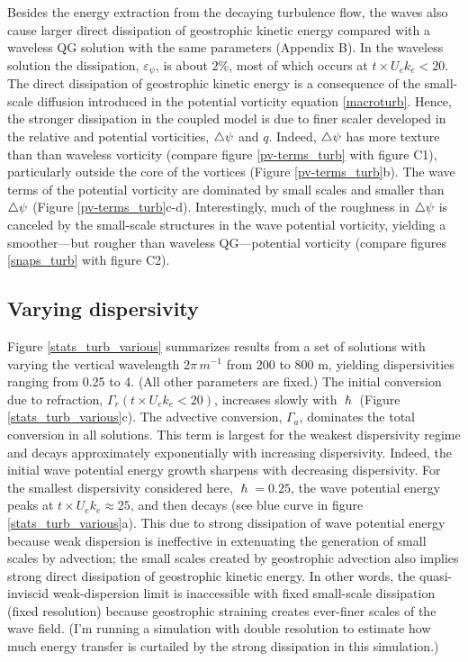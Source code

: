 \documentclass{jfm}
\begin{document}
Besides the energy extraction from the decaying turbulence flow, the waves
also cause larger direct dissipation of geostrophic kinetic energy compared with
a waveless QG solution with the same parameters (Appendix B). In the waveless solution
the dissipation, $\varepsilon_\psi$, is about $2\%$, most of which occurs at
$t\times U_e k_e < 20$. The direct dissipation of geostrophic kinetic energy is
a consequence of the small-scale diffusion introduced in the potential vorticity equation
\eqref{macroturb}. Hence, the stronger
dissipation in the coupled model is due to finer scaler developed in the relative
and potential
vorticities, $\triangle\psi$ and $q$. Indeed,
$\triangle\psi$ has more texture than than waveless vorticity
(compare figure \ref{pv-terms_turb} with figure C1),
particularly outside the core of the vortices (Figure \eqref{pv-terms_turb}b).
The wave terms of the potential vorticity  are dominated by small scales and
smaller than $\triangle\psi$ (Figure \eqref{pv-terms_turb}c-d). Interestingly, much
of the roughness in $\triangle\psi$ is canceled by the small-scale structures in the
wave potential vorticity, yielding a
smoother---but rougher than waveless QG---potential vorticity
 (compare figures \ref{snaps_turb} with figure C2).

\subsection{Varying dispersivity}
Figure \ref{stats_turb_various}
summarizes results from a set of solutions with varying the vertical wavelength
$2\pi\,m^{-1}$ from 200 to 800 m, yielding dispersivities ranging from 0.25 to 4.
(All other parameters are fixed.)
The initial conversion due to refraction, $\Gamma_r(t \times U_e k_e < 20)$,
increases slowly with $\hslash$ (Figure \ref{stats_turb_various}c). The advective
conversion, $\Gamma_a$, dominates the total conversion in all solutions. This term
is largest for the weakest dispersivity regime and
decays approximately exponentially with increasing dispersivity. Indeed, the initial
wave potential energy growth sharpens with decreasing dispersivity.
For the smallest dispersivity considered here, $\hslash = 0.25$,
the wave potential energy peaks at $t\times U_e k_e\approx 25$, and then decays
(see blue curve in figure \ref{stats_turb_various}a).
This due to strong dissipation of wave potential energy because weak dispersion is
ineffective in extenuating the generation of small scales by advection;
 the small scales created by geostrophic advection also implies strong direct
dissipation of geostrophic kinetic energy. In other words, the quasi-inviscid
weak-dispersion limit is inaccessible with fixed small-scale dissipation (fixed
resolution) because geostrophic straining creates ever-finer scales of the wave
field. \textcolor{cesar}{(I'm running a simulation with double resolution to
estimate how much energy transfer is curtailed by the strong dissipation in
this simulation.)}
\end{document}
